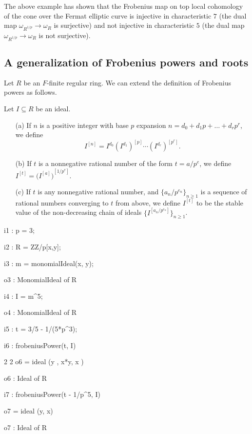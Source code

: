 \documentclass{amsart}
\renewcommand{\geq}{\geqslant}
\begin{document}
The above example has shown that the Frobenius map on top local cohomology of the cone over the Fermat elliptic curve is injective in characteristic $7$ (the dual map $\omega_{R^{1/p}} \to \omega_R$ is surjective) and not injective in characteristic $5$ (the dual map $\omega_{R^{1/p}} \to \omega_R$ is not surjective).

\subsection{A generalization of Frobenius powers and roots}

Let $R$ be an $F$-finite regular ring.
We can extend the definition of Frobenius powers as follows.

\begin{definition}
Let  $I\subseteq R$ be an ideal.
\begin{enumerate}
 \item[(a)] If $n$ is a positive integer with base $p$ expansion  $n=d_0 + d_1 p +  \dots + d_r p^r$, we define
\[ I^{[n]}=I^{d_0} (I^{d_1})^{[p]} \cdots  (I^{d_r})^{[p^r]}.\]
 \item[(b)] If $t$ is a nonnegative rational number of the form $t = a/p^e$, we define  $I^{[t]} = {\big(I^{[a]}\big)}^{[1/p^e]}.$
 \item[(c)] If $t$ is any nonnegative rational number, and $\{a_n/p^{e_n}\}_{n\geq 1}$ is a sequence of rational numbers converging to $t$ from above, we define $I^{[t]}$
 to be the stable value of the non-decreasing chain of ideals $\{I^{[a_n/p^{e_n}]}\}_{n\geq 1}$.
\end{enumerate}
\end{definition}

\medskip
{\small{}
\begin{MyVerbatim}
i1 : p = 3;

i2 : R = ZZ/p[x,y];

i3 : m = monomialIdeal(x, y);

o3 : MonomialIdeal of R

i4 : I = m^5;

o4 : MonomialIdeal of R

i5 : t = 3/5 - 1/(5*p^3);

i6 : frobeniusPower(t, I)

             2        2
o6 = ideal (y , x*y, x )

o6 : Ideal of R

i7 : frobeniusPower(t - 1/p^5, I)

o7 = ideal (y, x)

o7 : Ideal of R
\end{MyVerbatim}
}
\medskip
\end{document}
